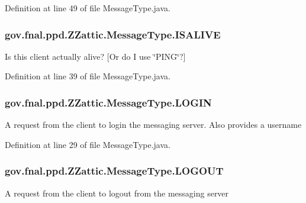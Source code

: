 Definition at line 49 of file Message\-Type.\-java.

\hypertarget{enumgov_1_1fnal_1_1ppd_1_1ZZattic_1_1MessageType_a3e7f3ad40f9b156630088a33669d66fc}{
\subsubsection[{I\-S\-A\-L\-I\-V\-E}]{\setlength{\rightskip}{0pt plus 5cm}gov.\-fnal.\-ppd.\-Z\-Zattic.\-Message\-Type.\-I\-S\-A\-L\-I\-V\-E}}\label{enumgov_1_1fnal_1_1ppd_1_1ZZattic_1_1MessageType_a3e7f3ad40f9b156630088a33669d66fc}
Is this client actually alive? \mbox{[}Or do I use \char`\"{}\-P\-I\-N\-G\char`\"{}?\mbox{]} 

Definition at line 39 of file Message\-Type.\-java.

\hypertarget{enumgov_1_1fnal_1_1ppd_1_1ZZattic_1_1MessageType_a1b2eaec8a1967aa6a8ff031be5981193}{
\subsubsection[{L\-O\-G\-I\-N}]{\setlength{\rightskip}{0pt plus 5cm}gov.\-fnal.\-ppd.\-Z\-Zattic.\-Message\-Type.\-L\-O\-G\-I\-N}}\label{enumgov_1_1fnal_1_1ppd_1_1ZZattic_1_1MessageType_a1b2eaec8a1967aa6a8ff031be5981193}
A request from the client to login the messaging server. Also provides a username 

Definition at line 29 of file Message\-Type.\-java.

\hypertarget{enumgov_1_1fnal_1_1ppd_1_1ZZattic_1_1MessageType_a30b69cd74904246b5e08ca7393f73280}{
\subsubsection[{L\-O\-G\-O\-U\-T}]{\setlength{\rightskip}{0pt plus 5cm}gov.\-fnal.\-ppd.\-Z\-Zattic.\-Message\-Type.\-L\-O\-G\-O\-U\-T}}\label{enumgov_1_1fnal_1_1ppd_1_1ZZattic_1_1MessageType_a30b69cd74904246b5e08ca7393f73280}
A request from the client to logout from the messaging server 

